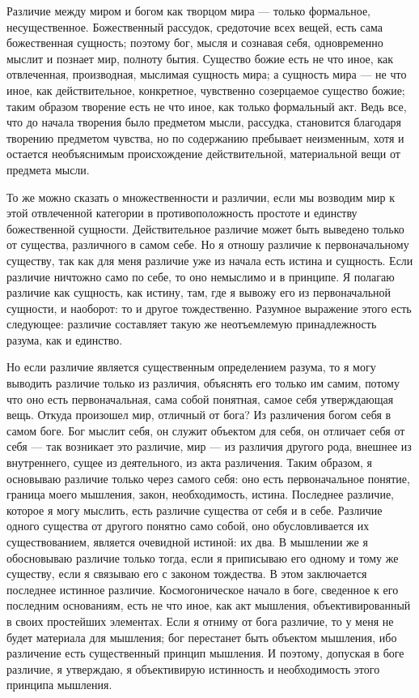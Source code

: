 \documentclass[12pt,oneside]{book}
\begin{document}
Различие между миром и богом как творцом мира --- только формальное, несущественное. Божественный рассудок, средоточие всех вещей, есть сама божественная сущность; поэтому бог, мысля и сознавая себя, одновременно мыслит и познает мир, полноту бытия. Существо божие есть не что иное, как отвлеченная, производная, мыслимая сущность мира; а сущность мира --- не что иное, как действительное, конкретное, чувственно созерцаемое существо божие; таким образом творение есть не что иное, как только формальный акт. Ведь все, что до начала творения было предметом мысли, рассудка, становится благодаря творению предметом чувства, но по содержанию пребывает неизменным, хотя и остается необъяснимым происхождение действительной, материальной вещи от предмета мысли\dag\let\svthefootnote\thefootnote\let\thefootnote\relax{}\let\thefootnote\svthefootnote.



То же можно сказать о множественности и различии, если мы возводим мир к этой отвлеченной категории в противоположность простоте и единству божественной сущности. Действительное различие может быть выведено только от существа, различного в самом себе. Но я отношу различие к первоначальному существу, так как для меня различие уже из начала есть истина и сущность. Если различие ничтожно само по себе, то оно немыслимо и в принципе. Я полагаю различие как сущность, как истину, там, где я вывожу его из первоначальной сущности, и наоборот: то и другое тождественно. Разумное выражение этого есть следующее: различие составляет такую же неотъемлемую принадлежность разума, как и единство.

Но если различие является существенным определением разума, то я могу выводить различие только из различия, объяснять его только им самим, потому что оно есть первоначальная, сама собой понятная, самое себя утверждающая вещь. Откуда произошел мир, отличный от бога? Из различения богом себя в самом боге. Бог мыслит себя, он служит объектом для себя, он отличает себя от себя --- так возникает это различие, мир --- из различия другого рода, внешнее из внутреннего, сущее из деятельного, из акта различения. Таким образом, я основываю различие только через самого себя: оно есть первоначальное понятие, граница моего мышления, закон, необходимость, истина. Последнее различие, которое я могу мыслить, есть различие существа от себя и в себе. Различие одного существа от другого понятно само собой, оно обусловливается их существованием, является очевидной истиной: их два. В мышлении же я обосновываю различие только тогда, если я приписываю его одному и тому же существу, если я связываю его с законом тождества. В этом заключается последнее истинное различие. Космогоническое начало в боге, сведенное к его последним основаниям, есть не что иное, как акт мышления, объективированный в своих простейших элементах. Если я отниму от бога различие, то у меня не будет материала для мышления; бог перестанет быть объектом мышления, ибо различение есть существенный принцип мышления. И поэтому, допуская в боге различие, я утверждаю, я объективирую истинность и необходимость этого принципа мышления.
\end{document}
